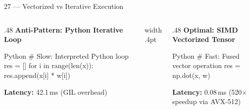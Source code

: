 \documentclass[aspectratio=169,10pt]{beamer}
\begin{document}
\begin{frame}[fragile]{27 — Vectorized vs Iterative Execution}
  \begin{columns}[T,onlytextwidth]
    \begin{column}{.48\textwidth}
      {\small\bfseries\color{BayesCrimson}Anti-Pattern: Python Iterative Loop}\par\vspace{.04cm}
\begin{CodeBlock}{Python}
# Slow: Interpreted Python loop
res = []
for i in range(len(x)):
    res.append(x[i] * w[i])
\end{CodeBlock}
      \vspace{.04cm}
      {\scriptsize\color{BayesSecondary}\textbf{Latency:} 42.1\,ms (GIL overhead)}
    \end{column}
    \hfill{\color{BayesBorder}\vrule width .4pt}\hfill
    \begin{column}{.48\textwidth}
      {\small\bfseries\color{BayesTeal}Optimal: SIMD Vectorized Tensor}\par\vspace{.04cm}
\begin{CodeBlock}{Python}
# Fast: Fused vector operation
res = np.dot(x, w)
\end{CodeBlock}
      \vspace{.04cm}
      {\scriptsize\color{BayesSecondary}\textbf{Latency:} 0.08\,ms (520$\times$ speedup via AVX-512)}
    \end{column}
  \end{columns}
  \vfill
\end{frame}
\end{document}
